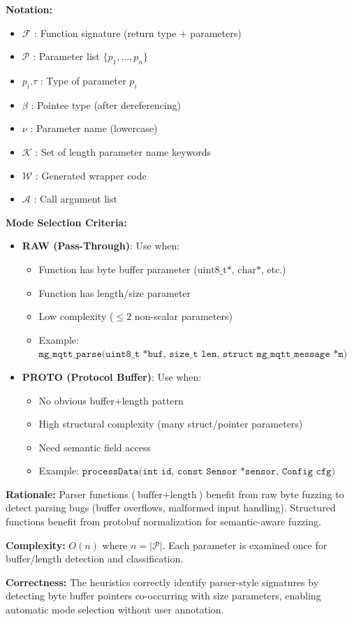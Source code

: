 \vspace{0.5cm}

\textbf{Notation:}
\begin{itemize}
    \item $\mathcal{F}$ : Function signature (return type + parameters)
    \item $\mathcal{P}$ : Parameter list $\{p_1, ..., p_n\}$
    \item $p_i.\tau$ : Type of parameter $p_i$
    \item $\beta$ : Pointee type (after dereferencing)
    \item $\nu$ : Parameter name (lowercase)
    \item $\mathcal{K}$ : Set of length parameter name keywords
    \item $\mathcal{W}$ : Generated wrapper code
    \item $\mathcal{A}$ : Call argument list
\end{itemize}

\textbf{Mode Selection Criteria:}
\begin{itemize}
    \item \textbf{RAW (Pass-Through)}: Use when:
    \begin{itemize}
        \item Function has byte buffer parameter ($\text{uint8\_t*}$, $\text{char*}$, etc.)
        \item Function has length/size parameter
        \item Low complexity ($ \leq 2$ non-scalar parameters)
        \item Example: $\texttt{mg\_mqtt\_parse(uint8\_t *buf, size\_t len, struct mg\_mqtt\_message *m)}$
    \end{itemize}

    \item \textbf{PROTO (Protocol Buffer)}: Use when:
    \begin{itemize}
        \item No obvious buffer+length pattern
        \item High structural complexity (many struct/pointer parameters)
        \item Need semantic field access
        \item Example: $\texttt{processData(int id, const Sensor *sensor, Config cfg)}$
    \end{itemize}
\end{itemize}

\textbf{Rationale:} Parser functions ($\text{buffer} + \text{length}$) benefit from raw byte fuzzing to detect parsing bugs (buffer overflows, malformed input handling). Structured functions benefit from protobuf normalization for semantic-aware fuzzing.

\textbf{Complexity:} $O(n)$ where $n = |\mathcal{P}|$. Each parameter is examined once for buffer/length detection and classification.

\textbf{Correctness:} The heuristics correctly identify parser-style signatures by detecting byte buffer pointers co-occurring with size parameters, enabling automatic mode selection without user annotation.
